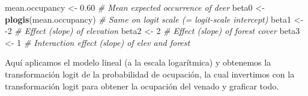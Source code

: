 \documentclass[
]{book}
\newenvironment{Shaded}{\begin{snugshade}}{\end{snugshade}}
\newcommand{\CommentTok}[1]{\textcolor[rgb]{0.56,0.35,0.01}{\textit{#1}}}
\newcommand{\DecValTok}[1]{\textcolor[rgb]{0.00,0.00,0.81}{#1}}
\newcommand{\FloatTok}[1]{\textcolor[rgb]{0.00,0.00,0.81}{#1}}
\newcommand{\KeywordTok}[1]{\textcolor[rgb]{0.13,0.29,0.53}{\textbf{#1}}}
\newcommand{\NormalTok}[1]{#1}
\newcommand{\StringTok}[1]{\textcolor[rgb]{0.31,0.60,0.02}{#1}}
\begin{document}
\begin{Shaded}
\begin{Highlighting}[]
\NormalTok{mean.occupancy <-}\StringTok{ }\FloatTok{0.60}         \CommentTok{# Mean expected occurrence of deer}
\NormalTok{beta0 <-}\StringTok{ }\KeywordTok{plogis}\NormalTok{(mean.occupancy) }\CommentTok{# Same on logit scale (= logit-scale intercept)}
\NormalTok{beta1 <-}\StringTok{ }\DecValTok{-2}                    \CommentTok{# Effect (slope) of elevation}
\NormalTok{beta2 <-}\StringTok{ }\DecValTok{2}                     \CommentTok{# Effect (slope) of forest cover}
\NormalTok{beta3 <-}\StringTok{ }\DecValTok{1}                     \CommentTok{# Interaction effect (slope) of elev and forest}
\end{Highlighting}
\end{Shaded}

Aquí aplicamos el modelo lineal (a la escala logarítmica) y obtenemos la transformación logit de la probabilidad de ocupación, la cual invertimos con la transformación logit para obtener la ocupación del venado y graficar todo.
\end{document}
